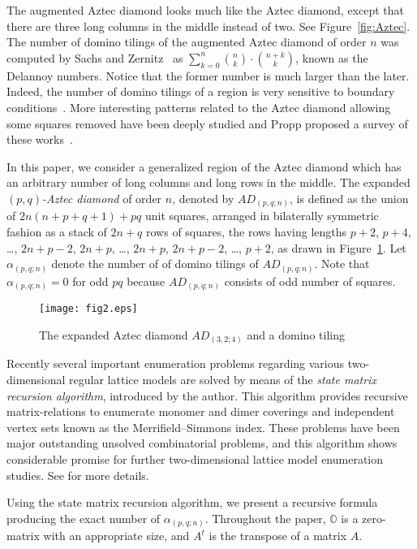 \documentclass[11pt,a4paper]{amsart}
\begin{document}
The augmented Aztec diamond looks much like the Aztec diamond,
except that there are three long columns in the middle instead of two.
See Figure~\ref{fig:Aztec}.
The number of domino tilings of the augmented Aztec diamond of order $n$
was computed by Sachs and Zernitz~\cite{SZ}
as $\sum_{k=0}^n {{n}\choose{k}} \cdot {{n+k}\choose{k}}$, known as the Delannoy numbers.
Notice that the former number is much larger than the later.
Indeed, the number of domino tilings of a region is very sensitive to boundary conditions~\cite{MS1, MS2}.
More interesting patterns related to the Aztec diamond allowing some squares removed
have been deeply studied and Propp proposed a survey of these works~\cite{Pr}.

In this paper, we consider a generalized region of the Aztec diamond
which has an arbitrary number of long columns and long rows in the middle. 
The expanded {\em $(p,q)$-Aztec diamond\/} of order $n$, denoted by $AD_{(p,q;n)}$,
is defined as the union of  $2n(n + p + q + 1) + pq$  unit squares,
arranged in bilaterally symmetric fashion as a stack of $2n + q$ rows of squares,
the rows having lengths $p \! + \! 2$, $p \! + \! 4$, \dots, $2n \! + \! p \! - \! 2$,
$2n \! + \! p$, \dots, $2n \! + \! p$, $2n \! + \! p \! - \! 2$, \dots, $p \! + \! 2$,
as drawn in Figure~\ref{fig:domino}.
Let $\alpha_{(p,q;n)}$ denote the number of of domino tilings of $AD_{(p,q;n)}$.
Note that $\alpha_{(p,q;n)} = 0$ for odd $pq$ because $AD_{(p,q;n)}$ consists of odd number of squares.

\begin{figure}[h]
\texttt{[image: fig2.eps]}
\caption{The expanded Aztec diamond $AD_{(3,2;4)}$ and a domino tiling}
\label{fig:domino}
\end{figure}

Recently several important enumeration problems regarding various two-dimensional regular lattice models
are solved by means of the {\em state matrix recursion algorithm\/}, introduced by the author.
This algorithm provides recursive matrix-relations to enumerate
monomer and dimer coverings and independent vertex sets known as the Merrifield--Simmons index.
These problems have been major outstanding unsolved combinatorial problems,
and this algorithm shows considerable promise for further two-dimensional lattice model enumeration studies.
See \cite{OhV2, OhD1, OhV1} for more details.

Using the state matrix recursion algorithm,
we present a recursive formula producing the exact number of $\alpha_{(p,q;n)}$.
Throughout the paper, $\mathbb{O}$ is a zero-matrix with an appropriate size,
and $A^t$ is the transpose of a matrix $A$.
\end{document}
